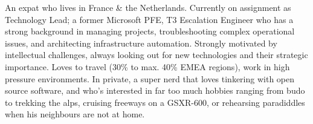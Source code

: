 %
%
%
\par{
An expat who lives in France \& the Netherlands. Currently on assignment as Technology Lead; a former Microsoft PFE, T3 Escalation Engineer who has a strong background in managing projects, troubleshooting complex operational issues, and architecting infrastructure automation. 
Strongly motivated by intellectual challenges, always looking out for new technologies and their strategic importance. Loves to travel (30\% to max. 40\% EMEA regions), work in high pressure environments. 
In private, a super nerd that loves tinkering with open source software, and who’s interested in far too much hobbies ranging from budo to trekking the alps, cruising freeways on a GSXR-600, or rehearsing paradiddles when his neighbours are not at home.
}